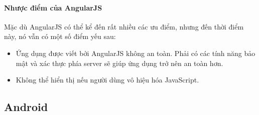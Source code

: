 \documentclass[a4paper]{article}
\begin{document}
\paragraph*{Nhược điểm của AngularJS}
Mặc dù AngularJS có thể kể đến rất nhiều các ưu điểm, nhưng đến thời điểm này, nó vẫn có một số điểm yếu sau:
\begin{itemize}
	\item Ứng dụng được viết bởi AngularJS không an toàn. Phải có các tính năng bảo mật và xác thực phía server sẽ giúp ứng dụng trở nên an toàn hơn.

	\item Không thể hiển thị nếu người dùng vô hiệu hóa JavaScript.
\end{itemize}

\subsection{Android}
\end{document}
